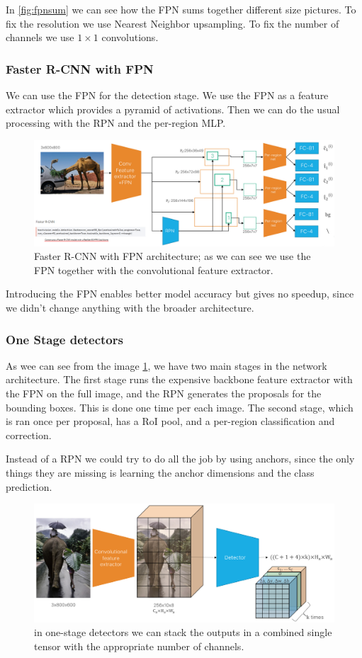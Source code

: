In \ref{fig:fpnsum} we can see how the FPN sums together different size pictures.
To fix the resolution we use Nearest Neighbor upsampling.
To fix the number of channels we use $1\times 1$ convolutions.

\subsubsection{Faster R-CNN with FPN}
We can use the FPN for the detection stage.
We use the FPN as a feature extractor which provides a pyramid of activations.
Then we can do the usual processing with the RPN and the per-region MLP.

\begin{figure}[htbp]
  \centering
  \includegraphics[width=0.6\linewidth]{./img/frcnn_fpn.png}
  \caption{Faster R-CNN with FPN architecture; as we can see we use the FPN together with the convolutional feature extractor.}
  \label{fig:frcnn_fpn}
\end{figure}

Introducing the FPN enables better model accuracy but gives no speedup, since we didn't change anything with the broader architecture.

\subsubsection{One Stage detectors}
As wee can see from the image \ref{fig:frcnn_fpn}, we have two main stages in the network architecture.
The first stage runs the expensive backbone feature extractor with the FPN on the full image, and the RPN generates the proposals for the bounding boxes.
This is done one time per each image.
The second stage, which is ran once per proposal, has a RoI pool, and a per-region classification and correction.

Instead of a RPN we could try to do all the job by using anchors, since the only things they are missing is learning the anchor dimensions and the class prediction.

\begin{figure}[htbp]
  \centering
  \includegraphics[width=0.6\linewidth]{./img/one_stage_detector.png}
  \caption{in one-stage detectors we can stack the outputs in a combined single tensor with the appropriate number of channels.}
\end{figure}

